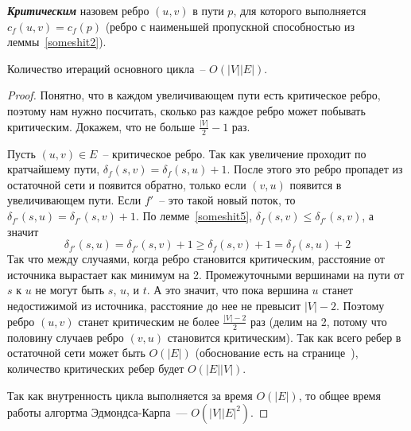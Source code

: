 \begin{definition}
	{\bf\it Критическим} назовем ребро $(u,v)$ в пути $p$, для которого выполняется $c_f(u,v)=c_f(p)$ (ребро с наименьшей пропускной способностью из леммы~\ref{someshit2}).
\end{definition}
\begin{lemma}
	Количество итераций основного цикла~-- $O(|V||E|)$.
\end{lemma}
\begin{proof}
	Понятно, что в каждом увеличивающем пути есть критическое ребро, поэтому нам нужно посчитать, сколько раз каждое ребро может побывать критическим. 
	Докажем, что не больше $\frac{|V|}{2}-1$ раз.
	
	Пусть $(u,v)\in E$~-- критическое ребро. Так как увеличение проходит по кратчайшему пути, $\delta_f(s,v)=\delta_f(s,u)+1$. После этого это ребро пропадет из остаточной сети и появится обратно, только если $(v,u)$ появится в увеличивающем пути. Если $f'$~-- это такой новый поток, то $\delta_{f'}(s,u)=\delta_{f'}(s,v)+1$. По лемме~\ref{someshit5}, $\delta_f(s,v)\le\delta_{f'}(s,v)$, а значит
	$$
	\delta_{f'}(s,u)=\delta_{f'}(s,v)+1\ge\delta_f(s,v)+1=\delta_f(s,u)+2
	$$
	Так что  между случаями, когда ребро становится критическим, расстояние от источника вырастает как минимум на 2. Промежуточными вершинами на пути от $s$ к $u$ не могут быть $s$, $u$, и $t$. А это значит, что пока вершина $u$ станет недостижимой из источника, расстояние до нее не превысит $|V|-2$. Поэтому ребро $(u,v)$ станет критическим не более $\frac{|V|-2}{2}$ раз (делим на 2, потому что половину случаев ребро $(v,u)$ становится критическим). Так как всего ребер в остаточной сети может быть $O(|E|)$ (обоснование есть на странице~\pageref{someshit6}), количество критических ребер будет $O(|E||V|)$.
	
	Так как внутренность цикла выполняется за время $O(|E|)$, то общее время работы алгортма Эдмондса-Карпа~--- $O(|V||E|^2)$.
\end{proof}